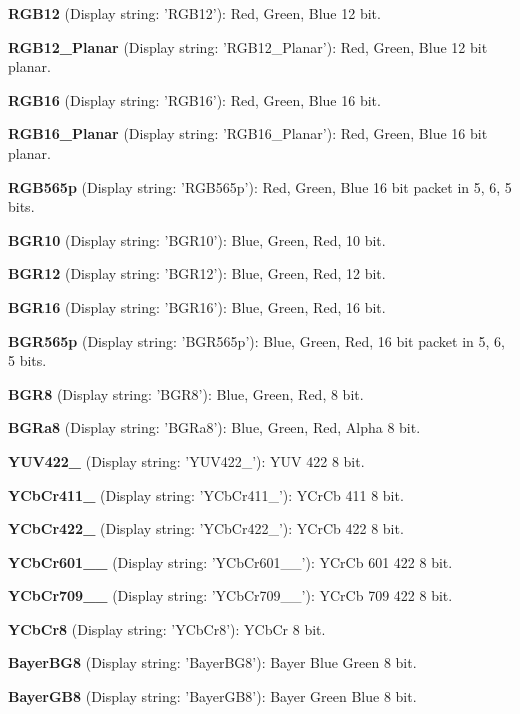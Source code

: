 \begin{DoxyItemize}
\item {\bfseries R\+G\+B12} (Display string\+: 'R\+G\+B12')\+: Red, Green, Blue 12 bit.
\item {\bfseries R\+G\+B12\+\_\+\+Planar} (Display string\+: 'R\+G\+B12\+\_\+\+Planar')\+: Red, Green, Blue 12 bit planar.
\item {\bfseries R\+G\+B16} (Display string\+: 'R\+G\+B16')\+: Red, Green, Blue 16 bit.
\item {\bfseries R\+G\+B16\+\_\+\+Planar} (Display string\+: 'R\+G\+B16\+\_\+\+Planar')\+: Red, Green, Blue 16 bit planar.
\item {\bfseries R\+G\+B565p} (Display string\+: 'R\+G\+B565p')\+: Red, Green, Blue 16 bit packet in 5, 6, 5 bits.
\item {\bfseries B\+G\+R10} (Display string\+: 'B\+G\+R10')\+: Blue, Green, Red, 10 bit.
\item {\bfseries B\+G\+R12} (Display string\+: 'B\+G\+R12')\+: Blue, Green, Red, 12 bit.
\item {\bfseries B\+G\+R16} (Display string\+: 'B\+G\+R16')\+: Blue, Green, Red, 16 bit.
\item {\bfseries B\+G\+R565p} (Display string\+: 'B\+G\+R565p')\+: Blue, Green, Red, 16 bit packet in 5, 6, 5 bits.
\item {\bfseries B\+G\+R8} (Display string\+: 'B\+G\+R8')\+: Blue, Green, Red, 8 bit.
\item {\bfseries B\+G\+Ra8} (Display string\+: 'B\+G\+Ra8')\+: Blue, Green, Red, Alpha 8 bit.
\item {\bfseries Y\+U\+V422\+\_} (Display string\+: 'Y\+U\+V422\+\_')\+: Y\+U\+V 422 8 bit.
\item {\bfseries Y\+Cb\+Cr411\+\_} (Display string\+: 'Y\+Cb\+Cr411\+\_')\+: Y\+Cr\+Cb 411 8 bit.
\item {\bfseries Y\+Cb\+Cr422\+\_} (Display string\+: 'Y\+Cb\+Cr422\+\_')\+: Y\+Cr\+Cb 422 8 bit.
\item {\bfseries Y\+Cb\+Cr601\+\_\+\_} (Display string\+: 'Y\+Cb\+Cr601\+\_\+\_')\+: Y\+Cr\+Cb 601 422 8 bit.
\item {\bfseries Y\+Cb\+Cr709\+\_\+\_} (Display string\+: 'Y\+Cb\+Cr709\+\_\+\_')\+: Y\+Cr\+Cb 709 422 8 bit.
\item {\bfseries Y\+Cb\+Cr8} (Display string\+: 'Y\+Cb\+Cr8')\+: Y\+Cb\+Cr 8 bit.
\item {\bfseries Bayer\+B\+G8} (Display string\+: 'Bayer\+B\+G8')\+: Bayer Blue Green 8 bit.
\item {\bfseries Bayer\+G\+B8} (Display string\+: 'Bayer\+G\+B8')\+: Bayer Green Blue 8 bit.

\end{DoxyItemize}
